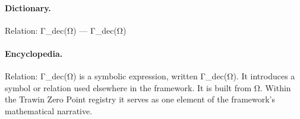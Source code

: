 \paragraph{Dictionary.}
Relation: Γ\_dec(Ω) — Γ\_dec(Ω)

\paragraph{Encyclopedia.}
Relation: Γ\_dec(Ω) is a symbolic expression, written Γ\_dec(Ω). It introduces a symbol or relation used elsewhere in the framework. It is built from Ω. Within the Trawin Zero Point registry it serves as one element of the framework's mathematical narrative.
